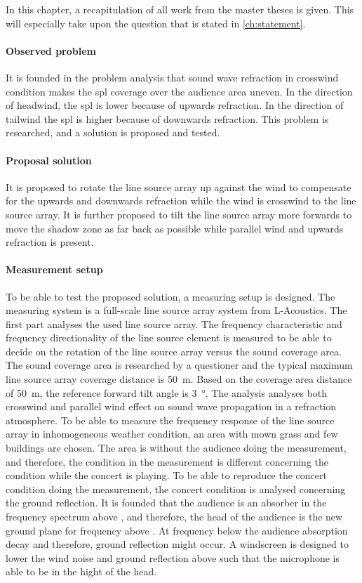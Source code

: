 In this chapter, a recapitulation of all work from the master theses is given. This will especially take upon the question that is stated in \autoref{ch:statement}.

\paragraph{Observed problem}
It is founded in the problem analysis that sound wave refraction in crosswind condition makes the \gls{spl} coverage over the audience area uneven. In the direction of headwind, the \gls{spl} is lower because of upwards refraction. In the direction of tailwind the \gls{spl} is higher because of downwards refraction.  This problem is researched, and a solution is proposed and tested.


\paragraph{Proposal solution}
It is proposed to rotate the line source array up against the wind to compensate for the upwards and downwards refraction while the wind is crosswind to the line source array. It is further proposed to tilt the line source array more forwards to move the shadow zone as far back as possible while parallel wind and upwards refraction is present. 

\paragraph{Measurement setup}
To be able to test the proposed solution, a measuring setup is designed. The measuring system is a full-scale line source array system from L-Acoustics. The first part analyses the used line source array. The frequency characteristic and frequency directionality of the line source element is measured to be able to decide on the rotation of the line source array versus the sound coverage area. The sound coverage area is researched by a questioner and the typical maximum line source array coverage distance is \SI{50}{\meter}. Based on the coverage area distance of \SI{50}{\meter}, the reference forward tilt angle is \SI{3}{\degree}. The analysis analyses both crosswind and parallel wind effect on sound wave propagation in a refraction atmosphere. To be able to measure the frequency response of the line source array in inhomogeneous weather condition, an area with mown grass and few buildings are chosen. The area is without the audience doing the measurement, and therefore, the condition in the measurement is different concerning the condition while the concert is playing. To be able to reproduce the concert condition doing the measurement, the concert condition is analysed concerning the ground reflection. It is founded that the audience is an absorber in the frequency spectrum above , and therefore, the head of the audience is the new ground plane for frequency above . At frequency below the audience absorption decay and therefore, ground reflection might occur. A windscreen is designed to lower the wind noise and ground reflection above  such that the microphone is able to be in the hight of the head. 

